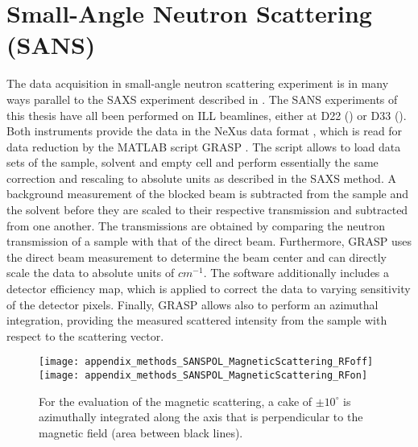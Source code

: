 \documentclass[\main/dresen_thesis.tex]{subfiles}
\begin{document}
  \section{Small-Angle Neutron Scattering (SANS)}
    \label{ch:methods:sans}
    The data acquisition in small-angle neutron scattering experiment is in many ways parallel to the SAXS experiment described in .
    The SANS experiments of this thesis have all been performed on ILL beamlines, either at D22 () or D33 ().
    Both instruments provide the data in the NeXus data format \cite{Koennecke_2015_Thene}, which is read for data reduction by the MATLAB script GRASP \cite{Dewhurst_2003_Grasp}.
    The script allows to load data sets of the sample, solvent and empty cell and perform essentially the same correction and rescaling to absolute units as described in the SAXS method.
    A background measurement of the blocked beam is subtracted from the sample and the solvent before they are scaled to their respective transmission and subtracted from one another.
    The transmissions are obtained by comparing the neutron transmission of a sample with that of the direct beam.
    Furthermore, GRASP uses the direct beam measurement to determine the beam center and can directly scale the data to absolute units of $\unit{cm^{-1}}$.
    The software additionally includes a detector efficiency map, which is applied to correct the data to varying sensitivity of the detector pixels.
    Finally, GRASP allows also to perform an azimuthal integration, providing the measured scattered intensity from the sample with respect to the scattering vector.

    \begin{figure}[tb]
      \centering
      \texttt{[image: appendix\_methods\_SANSPOL\_MagneticScattering\_RFoff]}
      \texttt{[image: appendix\_methods\_SANSPOL\_MagneticScattering\_RFon]}
      \caption{\label{fig:methods:sans:sanspolData}For the evaluation of the magnetic scattering, a cake of $\pm 10^\circ$ is azimuthally integrated along the axis that is perpendicular to the magnetic field (area between black lines).}
    \end{figure}
\end{document}

